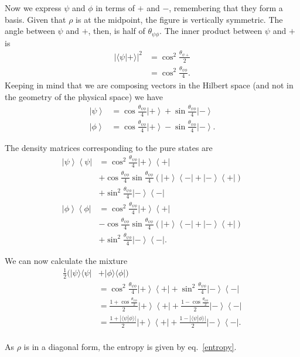 \documentclass[10pt,twocolumn, nofootinbib]{revtex4-2}
\begin{document}
Now we express $\psi$ and $\phi$ in terms of $+$ and $-$, remembering that they form a basis. Given that $\rho$ is at the midpoint, the figure is vertically symmetric. The angle between $\psi$ and $+$, then, is half of $\theta_{\psi\phi}$. The inner product between $\psi$ and $+$ is
\begin{equation}
	\begin{aligned}
	|\langle \psi | + \rangle |^2 &= \cos^2 \frac{\theta_{\psi +}}{2} \\
&= \cos^2 \frac{\theta_{\psi\phi}}{4}.
	\end{aligned}
\end{equation}
Keeping in mind that we are composing vectors in the Hilbert space (and not in the geometry of the physical space) we have
\begin{align*}
	\left|\psi\right>&=\cos\frac{\theta_{\psi\phi}}{4}\left|+\right>+\sin\frac{\theta_{\psi\phi}}{4}\left|-\right> \\
	\left|\phi\right>&=\cos\frac{\theta_{\psi\phi}}{4}\left|+\right>-\sin\frac{\theta_{\psi\phi}}{4}\left|-\right>.
\end{align*}

The density matrices corresponding to the pure states are
\begin{align*}
	\left|\psi\right>\left<\psi\right|&=\cos^2\frac{\theta_{\psi\phi}}{4}\left|+\right>\left<+\right|\\
	&+\cos\frac{\theta_{\psi\phi}}{4}\sin\frac{\theta_{\psi\phi}}{4}\left(\left|+\right>\left<-\right|+\left|-\right>\left<+\right|\right) \\
	&+\sin^2\frac{\theta_{\psi\phi}}{4}\left|-\right>\left<-\right| \\
	\left|\phi\right>\left<\phi\right|&=\cos^2\frac{\theta_{\psi\phi}}{4}\left|+\right>\left<+\right|\\
	&-\cos\frac{\theta_{\psi\phi}}{4}\sin\frac{\theta_{\psi\phi}}{4}\left(\left|+\right>\left<-\right|+\left|-\right>\left<+\right|\right) \\
	&+\sin^2\frac{\theta_{\psi\phi}}{4}\left|-\right>\left<-\right|.
\end{align*}

We can now calculate the mixture
\begin{align*}
	\frac{1}{2}(|\psi\rangle\langle\psi| &+ |\phi\rangle\langle\phi|) \\
	&=\cos^2\frac{\theta_{\psi\phi}}{4}\left|+\right>\left<+\right| +\sin^2\frac{\theta_{\psi\phi}}{4}\left|-\right>\left<-\right| \\
	&=\frac{1+\cos\frac{\theta_{\psi\phi}}{2}}{2}\left|+\right>\left<+\right| +\frac{1-\cos\frac{\theta_{\psi\phi}}{2}}{2}\left|-\right>\left<-\right| \\
	&=\frac{1+|\langle\psi|\phi\rangle|}{2}\left|+\right>\left<+\right| +\frac{1-|\langle\psi|\phi\rangle|}{2}\left|-\right>\left<-\right|. \\
\end{align*}

As $\rho$ is in a diagonal form, the entropy is given by eq.~\ref{entropy}.



\end{document}
